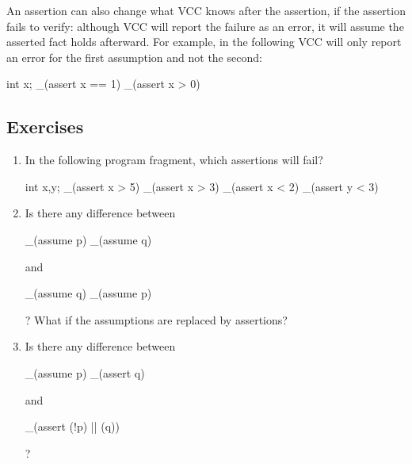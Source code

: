 
An assertion can also change what VCC knows after the assertion, if
the assertion fails to verify: although VCC will report the failure as an error,
it will assume the asserted fact holds afterward. For example, in the following
VCC will only report an error for the first assumption and not the second:
\begin{VCC}
int x;
_(assert x == 1)
_(assert x > 0)
\end{VCC}



\subsection*{Exercises}
\begin{enumerate}
\item
In the following program fragment, which assertions will fail?
\begin{VCC}
int x,y; 
_(assert x > 5) 
_(assert x > 3) 
_(assert x < 2) 
_(assert y < 3)
\end{VCC}
\item
Is there any difference between 
\begin{VCC}
_(assume p)
_(assume q)
\end{VCC}
and 
\begin{VCC}
_(assume q) 
_(assume p)
\end{VCC}
? What if the assumptions are replaced by assertions?
\item
Is there any difference between
\begin{VCC}
_(assume p)
_(assert q)
\end{VCC}
and 
\begin{VCC}
_(assert (!p) || (q))
\end{VCC}
? 

\end{enumerate}

